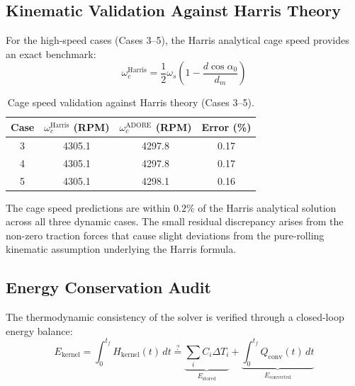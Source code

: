 \documentclass[preprint,12pt]{elsarticle}
\begin{document}
\subsection{Kinematic Validation Against Harris Theory}
\label{sec:harris}

For the high-speed cases (Cases 3--5), the Harris analytical cage speed provides an exact benchmark:
\begin{equation}
    \omega_c^{\text{Harris}} = \frac{1}{2}\omega_s \left(1 - \frac{d \cos\alpha_0}{d_m}\right)
    \label{eq:harris_cage}
\end{equation}

\begin{table}[htbp]
    \centering
    \caption{Cage speed validation against Harris theory (Cases 3--5).}
    \label{tab:cage_speed}
    \begin{tabular}{@{}cccc@{}}
        \toprule
        Case & $\omega_c^{\text{Harris}}$ (RPM) & $\omega_c^{\text{ADORE}}$ (RPM) & Error (\%) \\
        \midrule
        3 & 4305.1 & 4297.8 & 0.17 \\
        4 & 4305.1 & 4297.8 & 0.17 \\
        5 & 4305.1 & 4298.1 & 0.16 \\
        \bottomrule
    \end{tabular}
\end{table}

The cage speed predictions are within $0.2\%$ of the Harris analytical solution across all three dynamic cases. The small residual discrepancy arises from the non-zero traction forces that cause slight deviations from the pure-rolling kinematic assumption underlying the Harris formula.


\subsection{Energy Conservation Audit}
\label{sec:energy}

The thermodynamic consistency of the solver is verified through a closed-loop energy balance:
\begin{equation}
    E_{\text{kernel}} = \int_0^{t_f} H_{\text{kernel}}(t)\,dt \stackrel{?}{=} \underbrace{\sum_i C_i \Delta T_i}_{E_{\text{stored}}} + \underbrace{\int_0^{t_f} Q_{\text{conv}}(t)\,dt}_{E_{\text{convected}}}
    \label{eq:energy_balance}
\end{equation}
\end{document}
